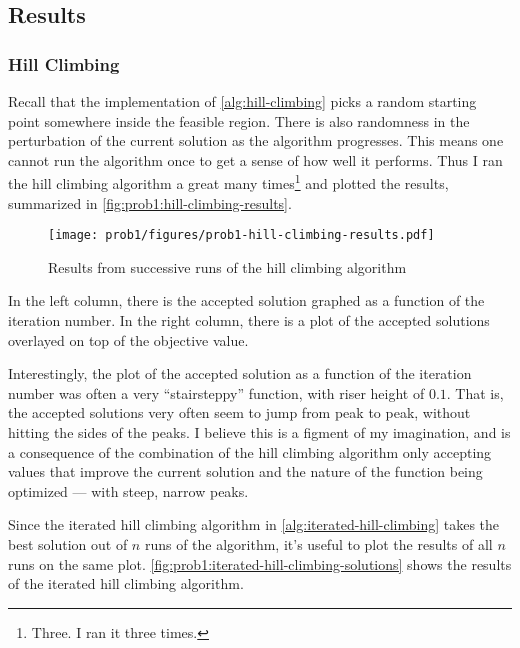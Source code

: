 \documentclass{article}
\begin{document}
\subsection{Results}

\subsubsection{Hill Climbing}

Recall that the implementation of \autoref{alg:hill-climbing} picks a random starting point
somewhere inside the feasible region. There is also randomness in the perturbation of the current
solution as the algorithm progresses. This means one cannot run the algorithm once to get a sense
of how well it performs. Thus I ran the hill climbing algorithm a great many times\footnote{Three.
    I ran it three times.} and plotted the results, summarized in
\autoref{fig:prob1:hill-climbing-results}.

\begin{figure}[H]
    \centering
    \texttt{[image: prob1/figures/prob1-hill-climbing-results.pdf]}
    \caption{Results from successive runs of the hill climbing
        algorithm}\label{fig:prob1:hill-climbing-results}
\end{figure}

In the left column, there is the accepted solution graphed as a function of the iteration number.
In the right column, there is a plot of the accepted solutions overlayed on top of the objective
value.

Interestingly, the plot of the accepted solution as a function of the iteration number was often a
very ``stairsteppy'' function, with riser height of $0.1$. That is, the accepted solutions very
often seem to jump from peak to peak, without hitting the sides of the peaks. I believe this is a
figment of my imagination, and is a consequence of the combination of the hill climbing algorithm
only accepting values that improve the current solution and the nature of the function being
optimized --- with steep, narrow peaks.

Since the iterated hill climbing algorithm in \autoref{alg:iterated-hill-climbing} takes the best
solution out of $n$ runs of the algorithm, it's useful to plot the results of all $n$ runs on the
same plot. \autoref{fig:prob1:iterated-hill-climbing-solutions} shows the results of the iterated
hill climbing algorithm.

\end{document}
